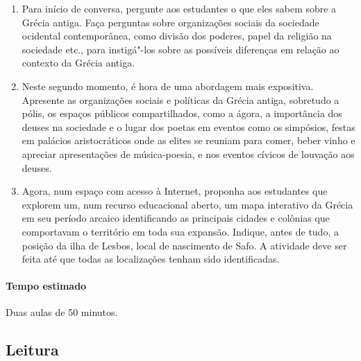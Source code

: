 \documentclass[12pt]{extarticle}
\begin{document}
\begin{enumerate}

	\item Para início de conversa, pergunte aos estudantes o que eles sabem sobre a Grécia
	antiga. Faça perguntas sobre organizações sociais da sociedade ocidental 
	contemporânea, como divisão dos poderes, papel da religião na sociedade etc.,
	para instigá"-los sobre as possíveis diferenças em relação ao contexto da Grécia
	antiga.

	\item Neste segundo momento, é hora de uma abordagem mais expositiva. Apresente
	as organizações sociais e políticas da Grécia antiga, sobretudo a pólis, os espaços
	públicos compartilhados, como a ágora, a importância dos deuses na sociedade e 
	o lugar dos poetas em eventos como os simpósios, festas em palácios aristocráticos
	onde as elites se reuniam para comer, beber vinho e apreciar apresentações
	de música-poesia, e nos eventos cívicos de louvação aos deuses. 

	\item Agora, num espaço com acesso à Internet, proponha aos estudantes que explorem 
	um, num recurso educacional aberto, um mapa interativo da Grécia em seu período 
	arcaico identificando as principais cidades e colônias que comportavam o território
	em toda sua expansão. Indique, antes de tudo, a posição da ilha de Lesbos, local de 
	nascimento de Safo. A atividade deve ser feita até que todas as localizações
	tenham sido identificadas.


\end{enumerate}


\paragraph{Tempo estimado} Duas aulas de 50 minutos.



\subsection{Leitura}


\end{document}
